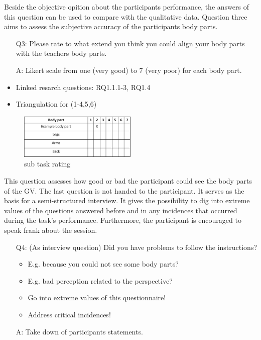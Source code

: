 Beside the objective opition about the participants performance, the answers of this question can be used to compare with the qualitative data. Question three aims to assess the subjective accuracy of the participants body parts.
\begin{itemize}
	\item[Q3:] Please rate to what extend you think you could align your body parts with the teachers body parts. 
	\item[A:] Likert scale from one (very good) to 7 (very poor) for each body part.
	\item Linked resarch questions: RQ1.1.1-3, RQ1.4
	\item Triangulation for (1-4,5,6)
\end{itemize} 
\begin{figure}[H]
	\centering
	\includegraphics[width=0.5\textwidth]{figures/body-parts-acc.png}
	\caption[sub task rating]{sub task rating}
	\label{fig:bodypartsacc}
\end{figure}
This question assesses how good or bad the participant could see the body parts of the GV. The last question is not handed to the participant. It serves as the basis for a semi-structured interview. It gives the possibility to dig into extreme values of the questions answered before and in any incidences that occurred during the task's performance. Furthermore, the participant is encouraged to speak frank about the session. 
\begin{itemize}
	\item[Q4:] (As interview question) Did you have problems to follow the instructions? 
	\begin{itemize}
		\item E.g. because you could not see some body parts?
		\item E.g. bad perception related to the perspective?
		\item Go into extreme values of this questionnaire! 
		\item Address critical incidences!
	\end{itemize}
	\item[A:] Take down of participants statements.
\end{itemize}

